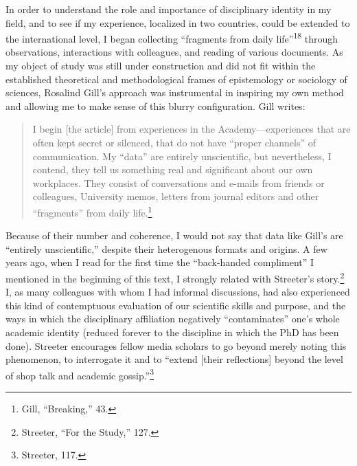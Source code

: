 \documentclass{tufte-handout}
\begin{document}
In order to understand the role and importance of disciplinary identity
in my field, and to see if my experience, localized in two countries,
could be extended to the international level, I began collecting
``fragments from daily life''\textsuperscript{18} through observations,
interactions with colleagues, and reading of various documents. As my
object of study was still under construction and did not fit within the
established theoretical and methodological frames of epistemology or
sociology of sciences, Rosalind Gill's approach was instrumental in
inspiring my own method and allowing me to make sense of this blurry
configuration. Gill writes:

\begin{quote}
I begin {[}the article{]} from experiences in the Academy---experiences
that are often kept secret or silenced, that do not have ``proper
channels'' of communication. My ``data'' are entirely unscientific, but
nevertheless, I contend, they tell\setcounter{footnote}{18} us something real and significant
about our own workplaces. They consist of conversations and e-mails from
friends or colleagues, University memos, letters from journal editors
and other ``fragments'' from daily life.\footnote{Gill, ``Breaking,''
  43.}
\end{quote}

\noindent Because of their number and coherence, I would not say that data like
Gill's are ``entirely unscientific,'' despite their heterogenous formats
and origins. A few years ago, when I read for the first time the
``back-handed compliment'' I mentioned in the beginning of this text, I
strongly related with Streeter's story.\footnote{Streeter, ``For the
  Study,'' 127.} I, as many colleagues with whom I had informal
discussions, had also experienced this kind of contemptuous evaluation
of our scientific skills and purpose, and the ways in which the
disciplinary affiliation negatively ``contaminates'' one's whole
academic identity (reduced forever to the discipline in which the PhD
has been done). Streeter encourages fellow media scholars to go beyond
merely noting this phenomenon, to interrogate it and to ``extend
{[}their reflections{]} beyond the level of shop talk and academic
gossip.''\footnote{Streeter, 117.}
\end{document}

